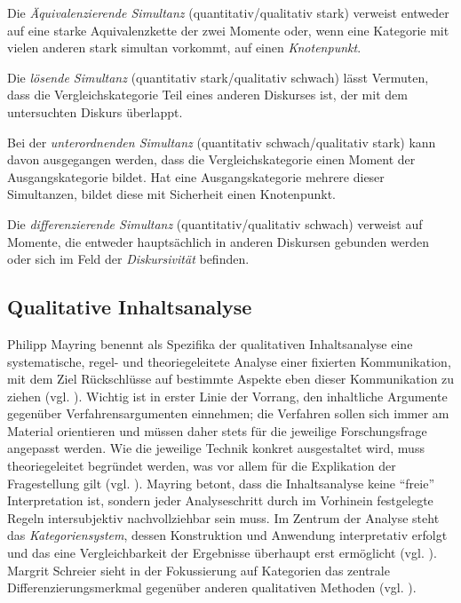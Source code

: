\documentclass[12pt, titlepage=true, toc=bib]{scrartcl}
\begin{document}
\noindent Die \textit{Äquivalenzierende Simultanz} (quantitativ/qualitativ stark) verweist entweder auf eine starke Aquivalenzkette der zwei Momente oder, wenn eine Kategorie mit vielen anderen stark simultan vorkommt, auf einen \textit{Knotenpunkt}.

\noindent Die \textit{lösende Simultanz} (quantitativ stark/qualitativ schwach) lässt Vermuten, dass die Vergleichskategorie Teil eines anderen Diskurses ist, der mit dem untersuchten Diskurs überlappt.

\noindent Bei der \textit{unterordnenden Simultanz} (quantitativ schwach/qualitativ stark) kann davon ausgegangen werden, dass die Vergleichskategorie einen Moment der Ausgangskategorie bildet. Hat eine Ausgangskategorie mehrere dieser Simultanzen, bildet diese mit Sicherheit einen Knotenpunkt.

\noindent Die \textit{differenzierende Simultanz} (quantitativ/qualitativ schwach) verweist auf Momente, die entweder hauptsächlich in anderen Diskursen gebunden werden oder sich im Feld der \textit{Diskursivität} befinden.

\subsection{Qualitative Inhaltsanalyse}

Philipp Mayring benennt als Spezifika der qualitativen Inhaltsanalyse eine systematische, regel- und theoriegeleitete Analyse einer fixierten Kommunikation, mit dem Ziel Rückschlüsse auf bestimmte Aspekte eben dieser Kommunikation zu ziehen (vgl. \cite*[13]{mayring_qualitative_2010}). Wichtig ist in erster Linie der Vorrang, den inhaltliche Argumente gegenüber Verfahrensargumenten einnehmen; die Verfahren sollen sich immer am Material orientieren und müssen daher stets für die jeweilige Forschungsfrage angepasst werden. Wie die jeweilige Technik konkret ausgestaltet wird, muss theoriegeleitet begründet werden, was vor allem für die Explikation der Fragestellung gilt (vgl. \cite[50-51]{mayring_qualitative_2010}). Mayring betont, dass die Inhaltsanalyse keine "`freie"' Interpretation ist, sondern jeder Analyseschritt durch im Vorhinein festgelegte Regeln intersubjektiv nachvollziehbar sein muss. Im Zentrum der Analyse steht das \textit{Kategoriensystem}, dessen Konstruktion und Anwendung interpretativ erfolgt und das eine Vergleichbarkeit der Ergebnisse überhaupt erst ermöglicht (vgl. \cite[49]{mayring_qualitative_2010}). Margrit Schreier sieht in der Fokussierung auf Kategorien das zentrale Differenzierungsmerkmal gegenüber anderen qualitativen Methoden (vgl. \cite[3]{schreier_varianten_2014}).
\end{document}
